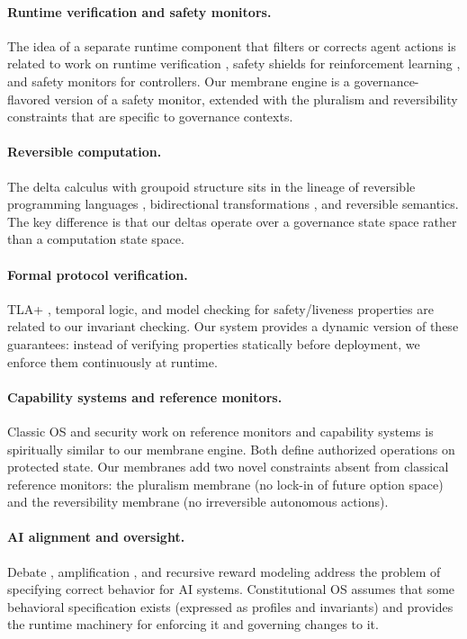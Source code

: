 \documentclass[11pt]{article}
\begin{document}
\paragraph{Runtime verification and safety monitors.}
The idea of a separate runtime component that filters or corrects
agent actions is related to work on runtime verification
\citep{leucker2009rv}, safety shields for reinforcement learning
\citep{alshiekh2018shielding}, and safety monitors for controllers.
Our membrane engine is a governance-flavored version of a safety
monitor, extended with the pluralism and reversibility constraints
that are specific to governance contexts.

\paragraph{Reversible computation.}
The delta calculus with groupoid structure sits in the lineage of
reversible programming languages \citep{yokoyama2007janus},
bidirectional transformations \citep{foster2007lens}, and
reversible semantics. The key difference is that our deltas operate
over a governance state space rather than a computation state space.

\paragraph{Formal protocol verification.}
TLA+ \citep{lamport2002tla}, temporal logic, and model checking for
safety/liveness properties are related to our invariant checking.
Our system provides a dynamic version of these guarantees:
instead of verifying properties statically before deployment,
we enforce them continuously at runtime.

\paragraph{Capability systems and reference monitors.}
Classic OS and security work on reference monitors
\citep{anderson1972refmon} and capability systems is spiritually
similar to our membrane engine. Both define authorized operations
on protected state. Our membranes add two novel constraints
absent from classical reference monitors: the pluralism membrane
(no lock-in of future option space) and the reversibility membrane
(no irreversible autonomous actions).

\paragraph{AI alignment and oversight.}
Debate \citep{irving2018debate}, amplification
\citep{christiano2018amplification}, and recursive reward
modeling \citep{leike2018reward} address the problem of specifying
correct behavior for AI systems. Constitutional OS assumes that
some behavioral specification exists (expressed as profiles and
invariants) and provides the runtime machinery for enforcing it
and governing changes to it.
\end{document}
